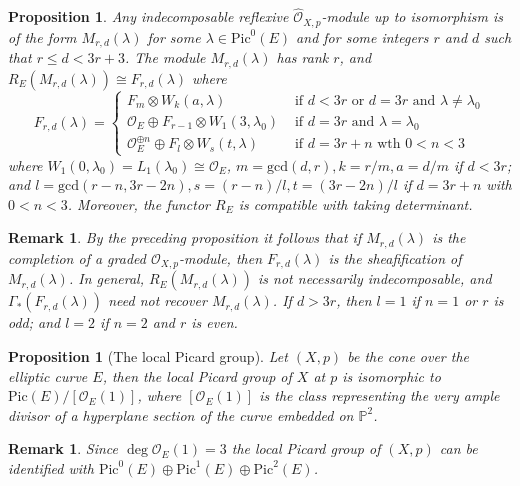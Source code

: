 \documentclass[12pt,oneside,reqno]{amsart}
\newtheorem{rmk}[theorem]{Remark}
\newtheorem{prop}[theorem]{Proposition}
\theoremstyle{definition}
\begin{document}
\begin{prop}
Any indecomposable reflexive $\hat{\mathcal{O}}_{X, p}$-module up to isomorphism is of the form $M_{r, d}(\lambda)$ for some $\lambda \in \mathrm{Pic}^0(E)$ and for some integers $r$ and $d$ such that $r \leq d < 3r + 3$. The module $M_{r, d}(\lambda)$ has rank $r$, and $R_E(M_{r, d}(\lambda)) \cong F_{r, d}(\lambda)$ where
\[
F_{r, d}(\lambda) = \begin{cases} F_{m} \otimes W_k(a, \lambda) & \textrm{ if } d < 3r \textrm{ or } d = 3r \textrm{ and } \lambda \neq \lambda_0 \\
\mathcal{O}_E \oplus F_{r - 1} \otimes W_{1}(3, \lambda_0) & \textrm{ if } d = 3r \textrm{ and } \lambda = \lambda_0 \\
\mathcal{O}_E^{\oplus n} \oplus F_l \otimes W_{s}(t, \lambda) & \textrm{ if } d = 3r + n
 \textrm{ wth } 0 < n < 3 \end{cases}
\]
where $W_1(0, \lambda_0) = L_1(\lambda_0) \cong \mathcal{O}_E$, $m = \mathrm{gcd}(d, r), k = r/m, a = d/m$ if $d < 3r$; and $l = \mathrm{gcd}(r - n, 3r - 2n), s = (r - n)/l, t = (3r - 2n)/l$ if $d = 3r + n$ with $0 < n < 3$. Moreover, the functor $R_E$ is compatible with taking determinant. 
\end{prop}

\begin{rmk}
By the preceding proposition it follows that if $M_{r, d}(\lambda)$ is the completion of a graded $\mathcal{O}_{X, p}$-module, then $F_{r, d}(\lambda)$ is the sheafification of $M_{r, d}(\lambda)$. In general, $R_E(M_{r, d}(\lambda))$ is not necessarily indecomposable, and $\Gamma_*(F_{r, d}(\lambda))$ need not recover $M_{r, d}(\lambda)$. If $d > 3r$, then $l = 1$ if $n = 1$ or $r$ is odd; and $l = 2$ if $n = 2$ and $r$ is even.
\end{rmk}

\begin{prop}[The local Picard group] 
Let $(X, p)$ be the cone over the elliptic curve $E$, then the local Picard group of $X$ at $p$ is isomorphic to $\mathrm{Pic}(E)/[\mathcal{O}_E(1)]$, where $[\mathcal{O}_E(1)]$ is the class representing the very ample divisor of a hyperplane section of the curve embedded on $\mathbb{P}^2$. 
\end{prop}

\begin{rmk}
Since $\deg \mathcal{O}_E(1) = 3$ the local Picard group of $(X, p)$ can be identified with $\mathrm{Pic}^0(E) \oplus \mathrm{Pic}^1(E) \oplus \mathrm{Pic}^2(E)$. 
\end{rmk}
\end{document}
